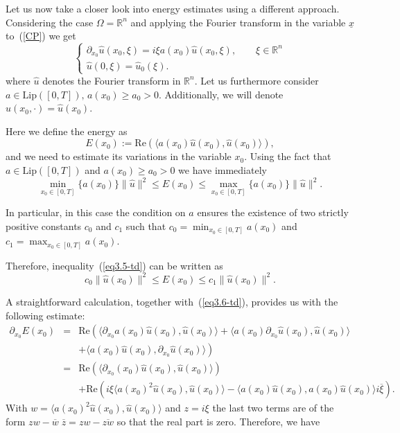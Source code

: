 \documentclass[12pt]{amsart}
\theoremstyle{definition}
\newcommand{\R}{\mathbb{R}}
\newcommand{\un}{\underline}
\begin{document}
Let us now take a closer look into energy estimates using a different approach. Considering the case $\Omega=\R^n$ and applying the Fourier transform in the variable $\un{x}$ to~(\ref{CP}) we get
\begin{equation}
\begin{cases}
\partial_{x_0}\hat{u}(x_0,\xi) = i\xi a(x_0)\hat{u}(x_0,\xi), \qquad \xi\in\R^n\\
\hat{u}(0,\xi) = \hat{u}_0(\xi).
\end{cases}
\label{eq3.4-td}
\end{equation}
where $\hat{u}$ denotes the Fourier transform in $\R^n$. Let us furthermore consider $a \in \text{Lip}([0, T]), \, a(x_0) \geq a_0 > 0$. Additionally, we will denote $\hat{u}(x_0,\cdot)=\hat{u}(x_0)$.

Here we define the energy as
\[
E(x_0) := \mathrm{Re}\left(\langle a(x_0)\hat{u}(x_0), \hat{u}(x_0) \rangle\right),
\]
and we need to estimate its variations in the variable $x_0$. Using the fact that $a \in \text{Lip}([0, T])$ and $a(x_0) \geq a_0 > 0$ we have immediately
\begin{equation}
\min_{x_0 \in [0,T]} \{a(x_0)\}\|\hat{u}\|^2\leq E(x_0) \leq \max_{x_0 \in [0,T]} \{a(x_0)\} \|\hat{u}\|^2 .
\label{eq3.5-td}
\end{equation}

In particular, in this case the condition on $a$ ensures the existence of two strictly positive constants $c_0 $ and $ c_1 $ such that $ c_0 = \min_{x_0 \in [0,T]} a(x_0) $ and $ c_1 = \max_{x_0 \in [0,T]} a(x_0) $.

Therefore, inequality~(\ref{eq3.5-td}) can be written as
\begin{equation}
c_0 \|\hat{u}(x_0)\|^2 \leq E(x_0) \leq c_1 \|\hat{u}(x_0)\|^2.
\label{eq3.6-td}
\end{equation}

A straightforward calculation, together with~(\ref{eq3.6-td}), provides us with the following estimate:
\begin{eqnarray*}
\partial_{x_0}E(x_0) & = & \mathrm{Re}\left(\langle \partial_{x_0}a(x_0)\hat{u}(x_0), \hat{u}(x_0) \rangle + \langle a(x_0)\partial_{x_0}\hat{u}(x_0), \hat{u}(x_0)\right. \rangle\\
&&  \left. + \langle a(x_0)\hat{u}(x_0), \partial_{x_0}\hat{u}(x_0) \rangle \right)\\
& = & \mathrm{Re}\left(\langle \partial_{x_0}(x_0)\hat{u}(x_0), \hat{u}(x_0) \rangle \right)\\
&& +  \mathrm{Re}\left(i\xi\langle a(x_0)^2\hat{u}(x_0), \hat{u}(x_0) \rangle - \langle a(x_0)\hat{u}(x_0), a(x_0)\hat{u}(x_0) \rangle i\overline{\xi}\right).
\end{eqnarray*}
With $w=\langle a(x_0)^2\hat{u}(x_0), \hat{u}(x_0) \rangle$ and $z=i\xi$ the last two terms are of the form $zw-\overline{w}\;\overline{z}=zw-\overline{zw}$ so that the real part is zero. Therefore, we have
\end{document}
